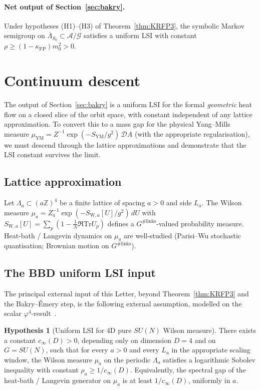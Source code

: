 \documentclass[11pt,a4paper]{amsart}
\theoremstyle{definition}
\newtheorem{hypothesis}[theorem]{Hypothesis}
\newcommand{\Z}{\mathbb{Z}}
\newcommand{\Tr}{\mathrm{Tr}}
\newcommand{\kFP}{\kappa_{\mathrm{FP}}}
\newcommand{\cinf}{c_{\infty}}
\begin{document}
\paragraph{Net output of Section~\ref{sec:bakry}.}
Under hypotheses (H1)--(H3) of Theorem~\ref{thm:KRFP3}, the symbolic Markov
semigroup on $\overline\Lambda_{S_0}\subset\mathcal A/\mathcal G$ satisfies
a uniform LSI with constant $\rho \geq (1-\kFP)m_0^2 > 0$.

\section{Continuum descent}\label{sec:descent}

The output of Section~\ref{sec:bakry} is a uniform LSI for the formal
\emph{geometric} heat flow on a closed slice of the orbit space, with
constant independent of any lattice approximation. To convert this to a
mass gap for the physical Yang--Mills measure
$\mu_\mathrm{YM} = Z^{-1}\exp(-S_\mathrm{YM}/g^2)\,\mathcal D A$ (with the
appropriate regularisation), we must descend through the lattice
approximations and demonstrate that the LSI constant survives the limit.

\subsection{Lattice approximation}
Let $\Lambda_a \subset (a\Z)^4$ be a finite lattice of spacing $a > 0$ and
side $L_a$. The Wilson measure
$\mu_a = Z_a^{-1}\exp(-S_{\mathrm{W},a}[U]/g^2)\,d U$ with
$S_{\mathrm{W},a}[U] = \sum_p (1 - \tfrac{1}{N}\Re\Tr U_p)$ defines a
$G^{\#\mathrm{links}}$-valued probability measure. Heat-bath / Langevin
dynamics on $\mu_a$ are well-studied (Parisi--Wu stochastic
quantisation; Brownian motion on $G^{\#\mathrm{links}}$).

\subsection{The BBD uniform LSI input}\label{sec:BBD}

The principal external input of this Letter, beyond
Theorem~\ref{thm:KRFP3} and the Bakry--\'Emery step, is the following
external assumption, modelled on the scalar
$\varphi^4$-result~\cite{BauerschmidtDagallier2024}.

\begin{hypothesis}[Uniform LSI for 4D pure $SU(N)$ Wilson measure]
\label{hyp:BBD}
There exists a constant $\cinf(D) > 0$, depending only on dimension $D = 4$
and on $G = SU(N)$, such that for every $a > 0$ and every $L_a$ in the
appropriate scaling window, the Wilson measure $\mu_a$ on the periodic
$\Lambda_a$ satisfies a logarithmic Sobolev inequality with constant
$\rho_a \geq 1/\cinf(D)$. Equivalently, the spectral gap of the
heat-bath / Langevin generator on $\mu_a$ is at least $1/\cinf(D)$,
uniformly in $a$.
\end{hypothesis}
\end{document}
